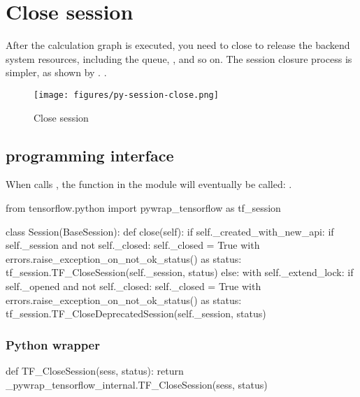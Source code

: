 \section{Close session}

\begin{content}

After the calculation graph is executed, you need to close  to release the backend system resources, including the queue, , and so on. The session closure process is simpler, as shown by . .

\begin{figure}[H]
\centering
\texttt{[image: figures/py-session-close.png]}
\caption{Close session}
 \label{fig:py-session-close}
\end{figure}

\subsection{programming interface}

When  calls , the function in the  module will eventually be called: .

\begin{leftbar}
\begin{python}[caption={tensorflow/python/client/session.py}]
from tensorflow.python import pywrap_tensorflow as tf_session

class Session(BaseSession):
  def close(self):
    if self._created_with_new_api:
      if self._session and not self._closed:
        self._closed = True
        with errors.raise_exception_on_not_ok_status() as status:
          tf_session.TF_CloseSession(self._session, status)
    else:
      with self._extend_lock:
        if self._opened and not self._closed:
          self._closed = True
          with errors.raise_exception_on_not_ok_status() as status:
            tf_session.TF_CloseDeprecatedSession(self._session, status)
\end{python}
\end{leftbar}

\subsubsection{Python wrapper}

\begin{leftbar}
\begin{python}[caption={tensorflow/bazel-bin/tensorflow/python/pywrap\_tensorflow\_internal.py}]
def TF_CloseSession(sess, status):
    return _pywrap_tensorflow_internal.TF_CloseSession(sess, status)


\end{python}
\end{leftbar}
\end{content}
